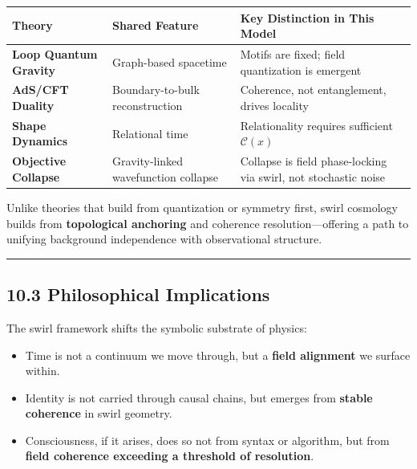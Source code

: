 \documentclass[
  11pt,
]{article}
\providecommand{\tightlist}{%
  \setlength{\itemsep}{0pt}\setlength{\parskip}{0pt}}
\begin{document}
\begin{longtable}[]{@{}
  >{\raggedright\arraybackslash}p{}
  >{\raggedright\arraybackslash}p{}
  >{\raggedright\arraybackslash}p{}@{}}
\toprule\noalign{}
\begin{minipage}[b]{\linewidth}\raggedright
Theory
\end{minipage} & \begin{minipage}[b]{\linewidth}\raggedright
Shared Feature
\end{minipage} & \begin{minipage}[b]{\linewidth}\raggedright
Key Distinction in This Model
\end{minipage} \\
\midrule\noalign{}
\endhead
\bottomrule\noalign{}
\endlastfoot
\textbf{Loop Quantum Gravity} & Graph-based spacetime & Motifs are
fixed; field quantization is emergent \\
\textbf{AdS/CFT Duality} & Boundary-to-bulk reconstruction & Coherence,
not entanglement, drives locality \\
\textbf{Shape Dynamics} & Relational time & Relationality requires
sufficient \(\mathcal{C}(x)\) \\
\textbf{Objective Collapse} & Gravity-linked wavefunction collapse &
Collapse is field phase-locking via swirl, not stochastic noise \\
\end{longtable}

Unlike theories that build from quantization or symmetry first, swirl
cosmology builds from \textbf{topological anchoring} and coherence
resolution---offering a path to unifying background independence with
observational structure.

\begin{center}\rule{0.5\linewidth}{0.5pt}\end{center}

\subsection{10.3 Philosophical
Implications}\label{philosophical-implications}

The swirl framework shifts the symbolic substrate of physics:

\begin{itemize}
\tightlist
\item
  Time is not a continuum we move through, but a \textbf{field
  alignment} we surface within.
\item
  Identity is not carried through causal chains, but emerges from
  \textbf{stable coherence} in swirl geometry.
\item
  Consciousness, if it arises, does so not from syntax or algorithm, but
  from \textbf{field coherence exceeding a threshold of resolution}.
\end{itemize}
\end{document}
